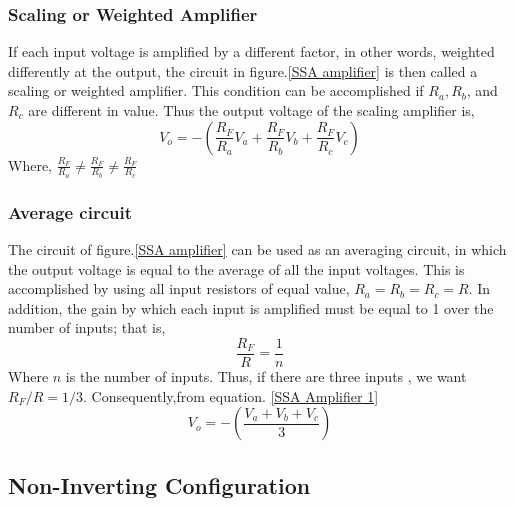    \subsubsection{Scaling or Weighted Amplifier}
   If each input voltage is amplified by a different factor, in other words, weighted differently at the output, the circuit in figure.\ref{SSA amplifier} is then called a scaling or weighted amplifier. This condition can be accomplished if $R_{a}, R_{b}$, and $R_{c}$ are different in value. Thus the output voltage of the scaling amplifier is,
   \begin{equation}
   V_{o}=-\left(\frac{R_{F}}{R_{a}} V_{a}+\frac{R_{F}}{R_{b}} V_{b}+\frac{R_{F}}{R_{c}} V_{c}\right)
   \end{equation}
   Where, $\frac{R_{F}}{R_{a}} \neq \frac{R_{F}}{R_{b}} \neq \frac{R_{F}}{R_{c}}$
   \subsubsection{Average circuit}
   The circuit of figure.\ref{SSA amplifier}  can be used as an averaging circuit, in which the output voltage is equal to the average of all the input voltages. This is accomplished by using all input resistors of equal value, $R_{a}=R_{b}=R_{c}=R$. In addition, the gain by which each input is amplified must be equal to 1 over the number of inputs; that is,
   $$
   \frac{R_{F}}{R}=\frac{1}{n}
   $$
   Where $n$ is the number of inputs.
   Thus, if there are three inputs , we want $R_{F} / R=1 / 3$. Consequently,from equation. \ref{SSA Amplifier 1}
   \begin{equation}
   V_{o}=-\left(\frac{V_{a}+V_{b}+V_{c}}{3}\right)
   \end{equation}
   \subsection{Non-Inverting Configuration}
